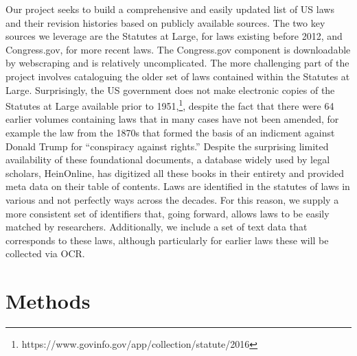 \documentclass[fleqn,10pt]{wlscirep}
\begin{document}
Our project seeks to build a comprehensive and easily updated list of US laws and their revision histories based on publicly available sources. The two key sources we leverage are the Statutes at Large, for laws existing before 2012, and Congress.gov, for more recent laws. The Congress.gov component is downloadable by webscraping and is relatively uncomplicated.  The more challenging part of the project involves cataloguing the older set of laws contained within the Statutes at Large. Surprisingly, the US government does not make electronic copies of the Statutes at Large available prior to 1951,\footnote{https://www.govinfo.gov/app/collection/statute/2016}, despite the fact that there were 64 earlier volumes containing laws that in many cases have not been amended, for example the law from the 1870s that formed the basis of an indicment against Donald Trump for ``conspiracy against rights.'' Despite the surprising limited availability of these foundational documents, a database widely used by legal scholars, HeinOnline, has digitized all these books in their entirety and provided meta data on their table of contents. Laws are identified in the statutes of laws in various and not perfectly ways across the decades. For this reason, we supply a more consistent set of identifiers that, going forward, allows laws to be easily matched by researchers. Additionally, we include a set of text data that corresponds to these laws, although particularly for earlier laws these will be collected via OCR. 

\section*{Methods}


\end{document}
